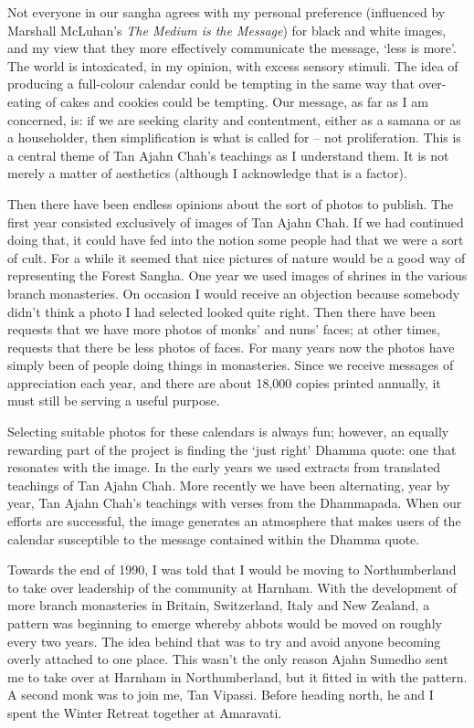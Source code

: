 Not everyone in our sangha agrees with my personal preference
(influenced by Marshall McLuhan's \emph{The Medium is the Message}) for
black and white images, and my view that they more effectively
communicate the message, `less is more'. The world is intoxicated, in my
opinion, with excess sensory stimuli. The idea of producing a
full-colour calendar could be tempting in the same way that over-eating
of cakes and cookies could be tempting. Our message, as far as I am
concerned, is: if we are seeking clarity and contentment, either as a
samana or as a householder, then simplification is what is called for --
not proliferation. This is a central theme of Tan Ajahn Chah's teachings
as I understand them. It is not merely a matter of aesthetics (although
I acknowledge that is a factor).

Then there have been endless opinions about the sort of photos to
publish. The first year consisted exclusively of images of Tan Ajahn
Chah. If we had continued doing that, it could have fed into the notion
some people had that we were a sort of cult. For a while it seemed that
nice pictures of nature would be a good way of representing the Forest
Sangha. One year we used images of shrines in the various branch
monasteries. On occasion I would receive an objection because somebody
didn't think a photo I had selected looked quite right. Then there have
been requests that we have more photos of monks' and nuns' faces; at
other times, requests that there be less photos of faces. For many years
now the photos have simply been of people doing things in monasteries.
Since we receive messages of appreciation each year, and there are about
18,000 copies printed annually, it must still be serving a useful
purpose.

Selecting suitable photos for these calendars is always fun; however, an
equally rewarding part of the project is finding the `just right' Dhamma
quote: one that resonates with the image. In the early years we used
extracts from translated teachings of Tan Ajahn Chah. More recently we
have been alternating, year by year, Tan Ajahn Chah's teachings with
verses from the Dhammapada. When our efforts are successful, the image
generates an atmosphere that makes users of the calendar susceptible to
the message contained within the Dhamma quote.

Towards the end of 1990, I was told that I would be moving to
Northumberland to take over leadership of the community at Harnham. With
the development of more branch monasteries in Britain, Switzerland,
Italy and New Zealand, a pattern was beginning to emerge whereby abbots
would be moved on roughly every two years. The idea behind that was to
try and avoid anyone becoming overly attached to one place. This wasn't
the only reason Ajahn Sumedho sent me to take over at Harnham in
Northumberland, but it fitted in with the pattern. A second monk was to
join me, Tan Vipassi. Before heading north, he and I spent the Winter
Retreat together at Amaravati.

